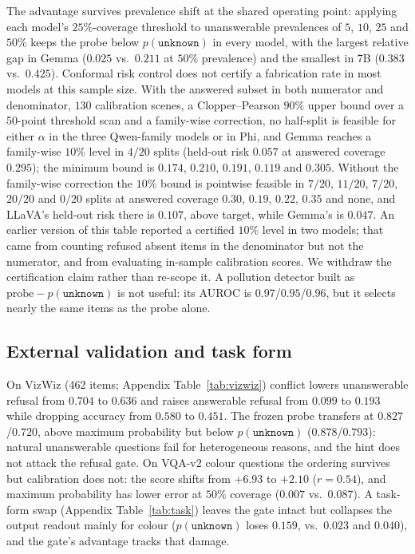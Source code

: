 \documentclass[10pt]{article}
\newcommand{\unknown}{\texttt{unknown}}
\newcommand{\punk}{p(\unknown)}
\begin{document}
The advantage survives prevalence shift at the shared operating point: applying each model's $25\%$-coverage threshold to unanswerable prevalences of $5$, $10$, $25$ and $50\%$ keeps the probe below $\punk$ in every model, with the largest relative gap in Gemma ($0.025$ vs.\ $0.211$ at $50\%$ prevalence) and the smallest in 7B ($0.383$ vs.\ $0.425$). Conformal risk control does not certify a fabrication rate in most models at this sample size. With the answered subset in both numerator and denominator, $130$ calibration scenes, a Clopper--Pearson $90\%$ upper bound over a 50-point threshold scan and a family-wise correction, no half-split is feasible for either $\alpha$ in the three Qwen-family models or in Phi, and Gemma reaches a family-wise $10\%$ level in $4/20$ splits (held-out risk $0.057$ at answered coverage $0.295$); the minimum bound is $0.174$, $0.210$, $0.191$, $0.119$ and $0.305$. Without the family-wise correction the $10\%$ bound is pointwise feasible in $7/20$, $11/20$, $7/20$, $20/20$ and $0/20$ splits at answered coverage $0.30$, $0.19$, $0.22$, $0.35$ and none, and LLaVA's held-out risk there is $0.107$, above target, while Gemma's is $0.047$. An earlier version of this table reported a certified $10\%$ level in two models; that came from counting refused absent items in the denominator but not the numerator, and from evaluating in-sample calibration scores. We withdraw the certification claim rather than re-scope it. A pollution detector built as $\text{probe}-\punk$ is not useful: its AUROC is $0.97$/$0.95$/$0.96$, but it selects nearly the same items as the probe alone.

\subsection{External validation and task form}

On VizWiz \citep{gurari2018vizwiz} (462 items; Appendix Table~\ref{tab:vizwiz}) conflict lowers unanswerable refusal from $0.704$ to $0.636$ and raises answerable refusal from $0.099$ to $0.193$ while dropping accuracy from $0.580$ to $0.451$. The frozen probe transfers at $0.827$/$0.720$, above maximum probability but below $\punk$ ($0.878$/$0.793$): natural unanswerable questions fail for heterogeneous reasons, and the hint does not attack the refusal gate. On VQA-v2 colour questions the ordering survives but calibration does not: the score shifts from $+6.93$ to $+2.10$ ($r=0.54$), and maximum probability has lower error at $50\%$ coverage ($0.007$ vs.\ $0.087$). A task-form swap (Appendix Table~\ref{tab:task}) leaves the gate intact but collapses the output readout mainly for colour ($\punk$ loses $0.159$, vs.\ $0.023$ and $0.040$), and the gate's advantage tracks that damage.
\end{document}
